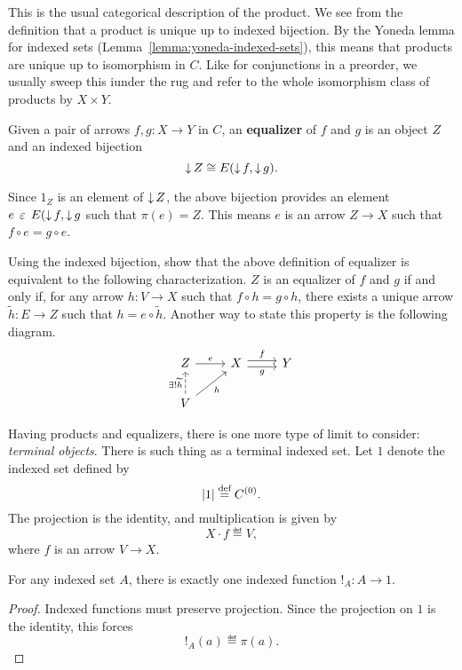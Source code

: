 \documentclass[../main.tex]{subfiles}
\begin{document}
This is the usual categorical description of the product. We see from the
definition that a product is unique up to indexed bijection. By the Yoneda lemma
for indexed sets (Lemma~\ref{lemma:yoneda-indexed-sets}), this means that
products are unique up to isomorphism in \(C\). Like for conjunctions in a
preorder, we usually sweep this iunder the rug and refer to the whole
isomorphism class of products by \(X \times Y\).
\begin{definition}
  Given a pair of arrows \(f,g: X \to Y\) in \(C\), an \textbf{equalizer} of
  \(f\) and \(g\) is an object \(Z\) and an indexed bijection
  \[%
    \dset Z \cong E(\dset f, \dset g).
  \]%
\end{definition}
Since \(1_Z\) is an element of \(\operatorname{\downarrow} Z\), the above bijection provides an
element \(e \mathrel{\,\varepsilon\,} E(\operatorname{\downarrow} f, \operatorname{\downarrow} g\) such that \(\pi(e) = Z\). This means
\(e\) is an arrow \(Z \to X\) such that \(f \circ e = g \circ e\).
\begin{warning_box*}
  \begin{exercise}
    Using the indexed bijection, show that the above definition of equalizer is
    equivalent to the following characterization. \(Z\) is an equalizer of \(f\)
    and \(g\) if and only if, for any arrow \(h : V \to X\) such that \(f \circ h
    = g \circ h\), there exists a unique arrow \(\widetilde{h} : E \to Z\) such
    that \(h = e \circ \widetilde{h}\). Another way to state this property is the
    following diagram.
    \[%
      \begin{tikzcd}
        Z \arrow[r,"e"] & X \arrow[r,"f",shift left=1] \arrow[r,"g", shift
        right=1, swap] & Y \\
        V \arrow[ur,"h", swap] \arrow[u, dashed, "\exists ! \widetilde{h}"]
        & & 
      \end{tikzcd}
    \]%
    \nosectionrule
  \end{exercise}
\end{warning_box*}
Having products and equalizers, there is one more type of limit to consider:
\emph{terminal objects}. There is such thing as a terminal indexed set. Let
\(1\) denote the indexed set defined by
\[%
  \abs{1} \eqdef C^{(0)}.
\]%
The projection is the identity, and multiplication is given by
\[%
  X \cdot f \eqdef V,
\]%
where \(f\) is an arrow \(V \to X\).
\begin{proposition}
  For any indexed set \(A\), there is exactly one indexed function \(!_A : A \to
  1\).
\end{proposition}
\begin{proof}
  Indexed functions must preserve projection. Since the projection on \(1\) is
  the identity, this forces
  \[%
    !_A(a) \eqdef \pi(a).
  \]%
\end{proof}
\end{document}
